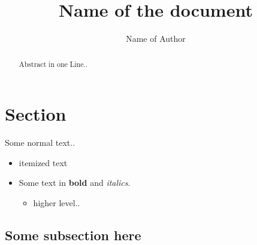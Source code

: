 \documentclass[journal,onecolumn]{IEEEtrancz}
\begin{document}
\title{Name of the document}
\author{Name of Author}

\maketitle

\begin{abstract}
	Abstract in one Line..
\end{abstract}

\IEEEpeerreviewmaketitle



\section{Section}

Some normal text..

\begin{itemize}
	\item itemized text
	\item Some text in \textbf{bold} and \textit{italics}.
	\begin{itemize}
		\item higher level..

\end{itemize}
\end{itemize}
\subsection{Some subsection here}
\end{document}
